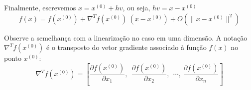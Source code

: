 Finalmente, escrevemos $x=x^{(0)}+hv$, ou seja, $hv=x-x^{(0)}$
\begin{equation} f(x)=f(x^{(0)})+ \nabla^T\! f(x^{(0)})\!~(x-x^{(0)})   + O(\|x-x^{(0)}\|^2) \end{equation}

\begin{obs} Observe a semelhança com a linearização no caso em uma dimensão. A notação $\nabla^T\! f(x^{(0)})$ é o transposto do vetor gradiente associado à função $f(x)$ no ponto $x^{(0)}$:
\begin{equation} \nabla^T f(x^{(0)})=\left[\frac{\partial f\left(x^{(0)}\right)}{\partial x_1},~~ \frac{\partial f\left(x^{(0)}\right)}{\partial x_2},~~ \cdots,~\frac{\partial f\left(x^{(0)}\right)}{\partial x_n}\right] \end{equation}
\end{obs}

